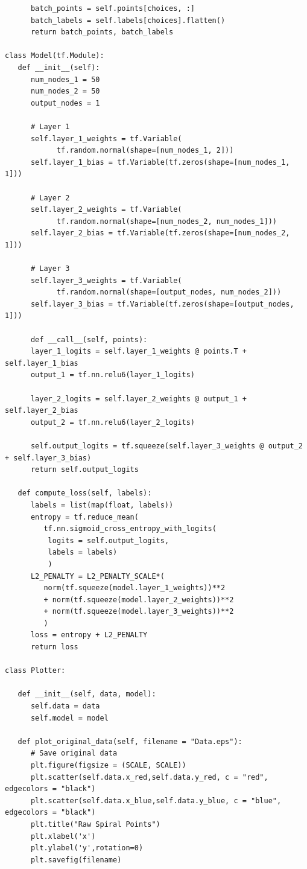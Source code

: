 \documentclass[12pt]{article}
\begin{document}
\begin{adjustwidth}{-50pt}{0pt}
\begin{Verbatim}
      batch_points = self.points[choices, :]
      batch_labels = self.labels[choices].flatten()
      return batch_points, batch_labels

class Model(tf.Module):
   def __init__(self):
      num_nodes_1 = 50
      num_nodes_2 = 50
      output_nodes = 1
      
      # Layer 1
      self.layer_1_weights = tf.Variable(
      		tf.random.normal(shape=[num_nodes_1, 2]))
      self.layer_1_bias = tf.Variable(tf.zeros(shape=[num_nodes_1, 1]))
      
      # Layer 2
      self.layer_2_weights = tf.Variable(
      		tf.random.normal(shape=[num_nodes_2, num_nodes_1]))
      self.layer_2_bias = tf.Variable(tf.zeros(shape=[num_nodes_2, 1]))
      
      # Layer 3
      self.layer_3_weights = tf.Variable(
      		tf.random.normal(shape=[output_nodes, num_nodes_2]))
      self.layer_3_bias = tf.Variable(tf.zeros(shape=[output_nodes, 1]))
      
      def __call__(self, points):
      layer_1_logits = self.layer_1_weights @ points.T + self.layer_1_bias
      output_1 = tf.nn.relu6(layer_1_logits)
      
      layer_2_logits = self.layer_2_weights @ output_1 + self.layer_2_bias
      output_2 = tf.nn.relu6(layer_2_logits)

      self.output_logits = tf.squeeze(self.layer_3_weights @ output_2 + self.layer_3_bias)
      return self.output_logits

   def compute_loss(self, labels):
      labels = list(map(float, labels))
      entropy = tf.reduce_mean(
     	 tf.nn.sigmoid_cross_entropy_with_logits(
	      logits = self.output_logits,
	      labels = labels)
	      )
      L2_PENALTY = L2_PENALTY_SCALE*(
         norm(tf.squeeze(model.layer_1_weights))**2
	     + norm(tf.squeeze(model.layer_2_weights))**2
	     + norm(tf.squeeze(model.layer_3_weights))**2
	     )
      loss = entropy + L2_PENALTY
      return loss

class Plotter:

   def __init__(self, data, model):
      self.data = data
      self.model = model

   def plot_original_data(self, filename = "Data.eps"):
      # Save original data
      plt.figure(figsize = (SCALE, SCALE))
      plt.scatter(self.data.x_red,self.data.y_red, c = "red", edgecolors = "black")
      plt.scatter(self.data.x_blue,self.data.y_blue, c = "blue", edgecolors = "black")
      plt.title("Raw Spiral Points")
      plt.xlabel('x')
      plt.ylabel('y',rotation=0)
      plt.savefig(filename)


\end{Verbatim}
\end{adjustwidth}
\end{document}
